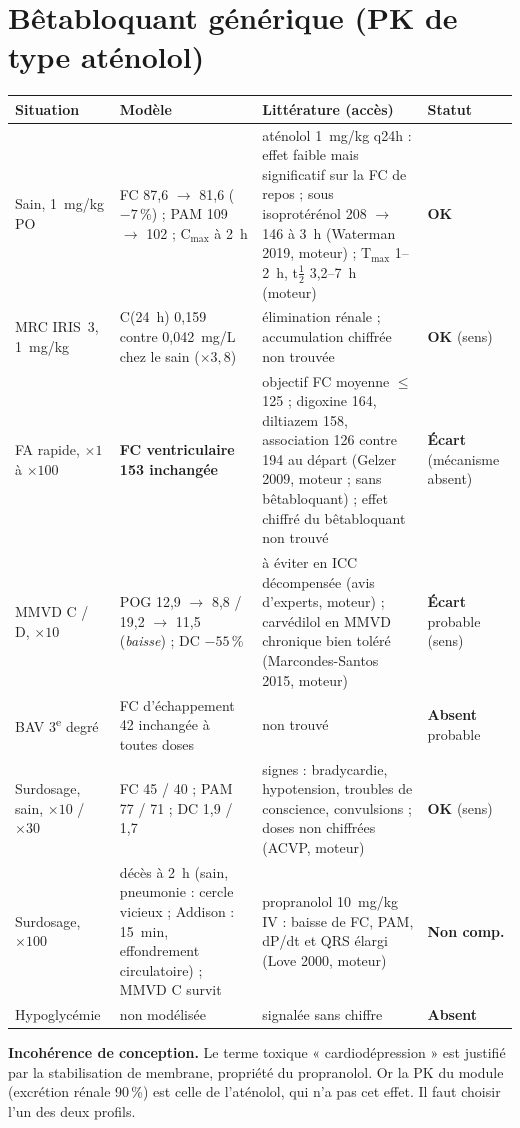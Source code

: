 \documentclass[10pt,a4paper]{article}
\newcommand{\ok}{\textcolor{green!45!black}{\textbf{OK}}}
\newcommand{\ecart}{\textcolor{red!70!black}{\textbf{Écart}}}
\newcommand{\nc}{\textcolor{black!60}{\textbf{Non comp.}}}
\newcommand{\absent}{\textcolor{red!70!black}{\textbf{Absent}}}
\begin{document}
\section{Bêtabloquant générique (PK de type aténolol)}

\begin{tabularx}{\linewidth}{@{}P{3.4cm}P{4.3cm}LP{1.8cm}@{}}
\toprule
Situation & Modèle & Littérature (accès) & Statut\\
\midrule\endhead
Sain, \SI{1}{mg/kg} PO & FC 87,6 $\rightarrow$ 81,6 ($-7$\,\%) ; PAM 109 $\rightarrow$ 102 ; C$_{\max}$ à 2~h & aténolol 1~mg/kg q24h : effet faible mais significatif sur la FC de repos ; sous isoprotérénol 208 $\rightarrow$ 146 à 3~h (Waterman 2019, moteur) ; T$_{\max}$ 1--2~h, t$\frac12$ 3,2--7~h (moteur) & \ok{}\\
MRC IRIS~3, \SI{1}{mg/kg} & C(24~h) 0,159 contre 0,042~mg/L chez le sain ($\times 3{,}8$) & élimination rénale ; accumulation chiffrée non trouvée & \ok{} (sens)\\
FA rapide, $\times 1$ à $\times 100$ & \textbf{FC ventriculaire 153 inchangée} & objectif FC moyenne $\leq$ 125 ; digoxine 164, diltiazem 158, association 126 contre 194 au départ (Gelzer 2009, moteur ; sans bêtabloquant) ; effet chiffré du bêtabloquant non trouvé & \ecart{} (mécanisme absent)\\
MMVD C / D, $\times 10$ & POG 12,9 $\rightarrow$ 8,8 / 19,2 $\rightarrow$ 11,5 (\emph{baisse}) ; DC $-55$\,\% & à éviter en ICC décompensée (avis d'experts, moteur) ; carvédilol en MMVD chronique bien toléré (Marcondes-Santos 2015, moteur) & \ecart{} probable (sens)\\
BAV 3\textsuperscript{e} degré & FC d'échappement 42 inchangée à toutes doses & non trouvé & \absent{} probable\\
Surdosage, sain, $\times 10$ / $\times 30$ & FC 45 / 40 ; PAM 77 / 71 ; DC 1,9 / 1,7 & signes : bradycardie, hypotension, troubles de conscience, convulsions ; doses non chiffrées (ACVP, moteur) & \ok{} (sens)\\
Surdosage, $\times 100$ & décès à 2~h (sain, pneumonie : cercle vicieux ; Addison : 15~min, effondrement circulatoire) ; MMVD C survit & propranolol 10~mg/kg IV : baisse de FC, PAM, dP/dt et QRS élargi (Love 2000, moteur) & \nc{}\\
Hypoglycémie & non modélisée & signalée sans chiffre & \absent{}\\
\bottomrule
\end{tabularx}

\textbf{Incohérence de conception.} Le terme toxique « cardiodépression » est justifié par la stabilisation de membrane, propriété du propranolol. Or la PK du module (excrétion rénale 90\,\%) est celle de l'aténolol, qui n'a pas cet effet. Il faut choisir l'un des deux profils.
\end{document}
